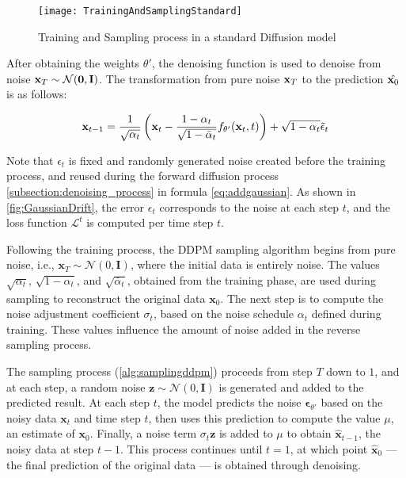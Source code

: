 \begin{figure*}
	\centering
	\texttt{[image: TrainingAndSamplingStandard]}
	\caption{Training and Sampling process in a standard Diffusion model}
	\label{fig:GaussianDrift}
\end{figure*}

After obtaining the weights $\theta'$, the denoising function is used to denoise from noise $\mathbf{x}_T \sim \mathcal{N} (\mathbf{0}, \mathbf{I})$.  
The transformation from pure noise $\mathbf{x}_{T}$ to the prediction $\hat{\mathbf{x}_0}$ is as follows:

\begin{equation}
	\label{eq:adddenoising}
	\mathbf{x}_{t-1} = \frac{1}{\sqrt{\alpha_t}} \left( \mathbf{x}_t - \frac{1- \alpha_t}{\sqrt{1 - \bar{\alpha}_t}} f_{\theta'}(\mathbf{x}_t, t) \right) + \sqrt{1 - \alpha_t} \tilde{\epsilon}_t
\end{equation}

Note that $\epsilon_t$ is fixed and randomly generated noise created before the training process, and reused during the forward diffusion process \autoref{subsection:denoising_process} in formula \autoref{eq:addgaussian}. As shown in \autoref{fig:GaussianDrift}, the error $\epsilon_t$ corresponds to the noise at each step $t$, and the loss function $\mathcal{L}^{t}$ is computed per time step $t$.

Following the training process, the DDPM sampling algorithm begins from pure noise, i.e., $\mathbf{x}_T \sim \mathcal{N}(0, \mathbf{I})$, where the initial data is entirely noise. The values $\sqrt{\alpha_t}$, $\sqrt{1 - \alpha_t}$, and $\sqrt{\bar{\alpha}_t}$, obtained from the training phase, are used during sampling to reconstruct the original data $\mathbf{x}_0$. The next step is to compute the noise adjustment coefficient $\sigma_t$, based on the noise schedule $\alpha_t$ defined during training. These values influence the amount of noise added in the reverse sampling process.

The sampling process (\autoref{alg:samplingddpm}) proceeds from step $T$ down to $1$, and at each step, a random noise $\mathbf{z} \sim \mathcal{N}(0, \mathbf{I})$ is generated and added to the predicted result. At each step $t$, the model predicts the noise $\boldsymbol{\epsilon}_{\theta'}$ based on the noisy data $\mathbf{x}_t$ and time step $t$, then uses this prediction to compute the value $\mu$, an estimate of $\mathbf{x}_0$. Finally, a noise term $\sigma_t \mathbf{z}$ is added to $\mu$ to obtain $\hat{\mathbf{x}}_{t-1}$, the noisy data at step $t-1$. This process continues until $t = 1$, at which point $\hat{\mathbf{x}}_0$ — the final prediction of the original data — is obtained through denoising.


